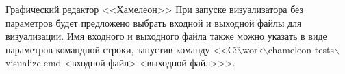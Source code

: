 \begin{problem}{Графический редактор <<Хамелеон>>}
При запуске визуализатора без параметров будет предложено выбрать
входной и выходной файлы для визуализации.
Имя входного и выходного файла также можно указать в виде
параметров командной строки, запустив команду
<<\t{С:$\backslash$work$\backslash$chameleon-tests$\backslash$visualize.cmd <входной файл> <выходной файл>}>>.

\end{problem}
